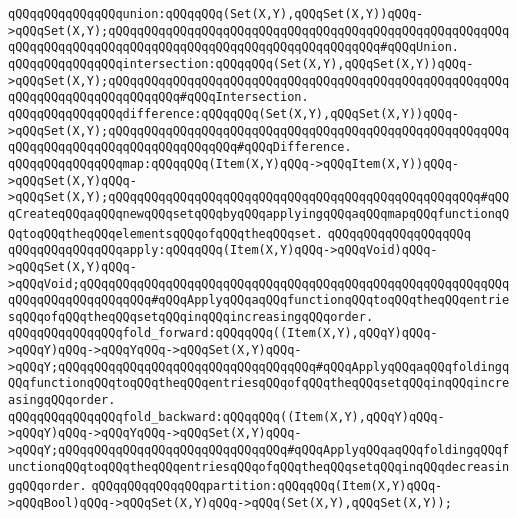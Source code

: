 \newline
\verb|qQQqqQQqqQQqqQQqunion:qQQqqQQq(Set(X,Y),qQQqSet(X,Y))qQQq->qQQqSet(X,Y);qQQqqQQqqQQqqQQqqQQqqQQqqQQqqQQqqQQqqQQqqQQqqQQqqQQqqQQqqQQqqQQqqQQqqQQqqQQqqQQqqQQqqQQqqQQqqQQqqQQqqQQqqQQq#qQQqUnion.|\newline
\newline
\verb|qQQqqQQqqQQqqQQqintersection:qQQqqQQq(Set(X,Y),qQQqSet(X,Y))qQQq->qQQqSet(X,Y);qQQqqQQqqQQqqQQqqQQqqQQqqQQqqQQqqQQqqQQqqQQqqQQqqQQqqQQqqQQqqQQqqQQqqQQqqQQqqQQq#qQQqIntersection.|\newline
\newline
\verb|qQQqqQQqqQQqqQQqdifference:qQQqqQQq(Set(X,Y),qQQqSet(X,Y))qQQq->qQQqSet(X,Y);qQQqqQQqqQQqqQQqqQQqqQQqqQQqqQQqqQQqqQQqqQQqqQQqqQQqqQQqqQQqqQQqqQQqqQQqqQQqqQQqqQQqqQQq#qQQqDifference.|\newline
\newline
\verb|qQQqqQQqqQQqqQQqmap:qQQqqQQq(Item(X,Y)qQQq->qQQqItem(X,Y))qQQq->qQQqSet(X,Y)qQQq->qQQqSet(X,Y);qQQqqQQqqQQqqQQqqQQqqQQqqQQqqQQqqQQqqQQqqQQqqQQqqQQq#qQQqCreateqQQqaqQQqnewqQQqsetqQQqbyqQQqapplyingqQQqaqQQqmapqQQqfunctionqQQqtoqQQqtheqQQqelementsqQQqofqQQqtheqQQqset.|\newline
\verb|qQQqqQQqqQQqqQQqqQQq|\newline
\verb|qQQqqQQqqQQqqQQqapply:qQQqqQQq(Item(X,Y)qQQq->qQQqVoid)qQQq->qQQqSet(X,Y)qQQq->qQQqVoid;qQQqqQQqqQQqqQQqqQQqqQQqqQQqqQQqqQQqqQQqqQQqqQQqqQQqqQQqqQQqqQQqqQQqqQQqqQQqqQQq#qQQqApplyqQQqaqQQqfunctionqQQqtoqQQqtheqQQqentriesqQQqofqQQqtheqQQqsetqQQqinqQQqincreasingqQQqorder.|\newline
\newline
\verb|qQQqqQQqqQQqqQQqfold_forward:qQQqqQQq((Item(X,Y),qQQqY)qQQq->qQQqY)qQQq->qQQqYqQQq->qQQqSet(X,Y)qQQq->qQQqY;qQQqqQQqqQQqqQQqqQQqqQQqqQQqqQQqqQQq#qQQqApplyqQQqaqQQqfoldingqQQqfunctionqQQqtoqQQqtheqQQqentriesqQQqofqQQqtheqQQqsetqQQqinqQQqincreasingqQQqorder.|\newline
\newline
\verb|qQQqqQQqqQQqqQQqfold_backward:qQQqqQQq((Item(X,Y),qQQqY)qQQq->qQQqY)qQQq->qQQqYqQQq->qQQqSet(X,Y)qQQq->qQQqY;qQQqqQQqqQQqqQQqqQQqqQQqqQQqqQQq#qQQqApplyqQQqaqQQqfoldingqQQqfunctionqQQqtoqQQqtheqQQqentriesqQQqofqQQqtheqQQqsetqQQqinqQQqdecreasingqQQqorder.|\newline
\newline
\verb|qQQqqQQqqQQqqQQqpartition:qQQqqQQq(Item(X,Y)qQQq->qQQqBool)qQQq->qQQqSet(X,Y)qQQq->qQQq(Set(X,Y),qQQqSet(X,Y));|\newline
\newline
